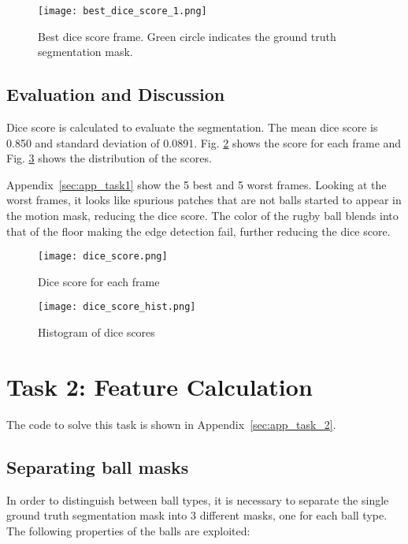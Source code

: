 \documentclass{report}
\begin{document}
\begin{figure}
    \centering
    \texttt{[image: best\_dice\_score\_1.png]}
    \caption{Best dice score frame. Green circle indicates the ground truth segmentation mask.}
    \label{fig:best_dice_score_1}
\end{figure}

\section{Evaluation and Discussion}

Dice score is calculated to evaluate the segmentation. The mean dice score is 0.850 and standard deviation of 0.0891. Fig. \ref{fig:dice_score} shows the score for each frame and Fig. \ref{fig:dice_score_hist} shows the distribution of the scores.

Appendix~\ref{sec:app_task1} show the 5 best and 5 worst frames. Looking at the worst frames, it looks like spurious patches that are not balls started to appear in the motion mask, reducing the dice score. The color of the rugby ball blends into that of the floor making the edge detection fail, further reducing the dice score.

\begin{figure}
    \centering
    \texttt{[image: dice\_score.png]}
    \caption{Dice score for each frame}
    \label{fig:dice_score}
\end{figure}

\begin{figure}
    \centering
    \texttt{[image: dice\_score\_hist.png]}
    \caption{Histogram of dice scores}
    \label{fig:dice_score_hist}
\end{figure}

\chapter{Task 2: Feature Calculation}

The code to solve this task is shown in Appendix~\ref{sec:app_task_2}.

\section{Separating ball masks}

In order to distinguish between ball types, it is necessary to separate the single ground truth segmentation mask into 3 different masks, one for each ball type. The following properties of the balls are exploited:
\end{document}

